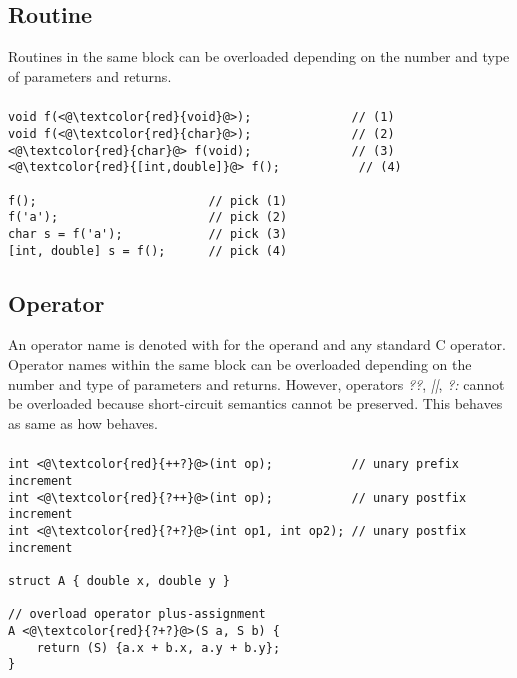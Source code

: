 \subsection{Routine}
Routines in the same block can be overloaded depending on the number and type of
parameters and returns.
\begin{frame}
\frametitle{}
\begin{lstlisting}
void f(<@\textcolor{red}{void}@>);              // (1)
void f(<@\textcolor{red}{char}@>);              // (2)
<@\textcolor{red}{char}@> f(void);              // (3)
<@\textcolor{red}{[int,double]}@> f();           // (4)

f();                        // pick (1)
f('a');                     // pick (2)
char s = f('a');            // pick (3)
[int, double] s = f();      // pick (4)
\end{lstlisting}
\end{frame}

\subsection{Operator}
An operator name is denoted with \? for the operand and any standard C
operator. Operator names within the same block can be overloaded depending on
the number and type of parameters and returns. However, operators \textit{??},
\textit{||}, \textit{?:} cannot be overloaded because short-circuit semantics
cannot be preserved. This behaves as same as how \CCS behaves.
\begin{frame}
\frametitle{}
\begin{lstlisting}
int <@\textcolor{red}{++?}@>(int op);           // unary prefix increment
int <@\textcolor{red}{?++}@>(int op);           // unary postfix increment
int <@\textcolor{red}{?+?}@>(int op1, int op2); // unary postfix increment

struct A { double x, double y }

// overload operator plus-assignment
A <@\textcolor{red}{?+?}@>(S a, S b) {
    return (S) {a.x + b.x, a.y + b.y};
}
\end{lstlisting}
\end{frame}
